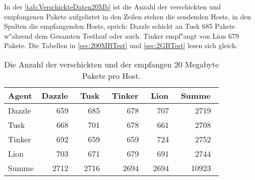 In der \cref{tab:VerschickteDaten20Mb} ist die Anzahl der verschickten und empfangenen Pakete aufgelistet %
in den Zeilen stehen die sendenden Hosts, in den Spalten die empfangenden Hosts, sprich: Dazzle schickt %
an Tusk 685 Pakete w"ahrend dem Gesamten Testlauf oder auch. Tinker empf"angt von Lion 679 Pakete. %
Die Tabellen in \cref{sec:200MBTest} und \cref{sec:2GBTest} lesen sich gleich. %


\begin{table}
\centering
\begin{tabular}{l%
 r<{\,}%
 r<{\,}%
 r<{\,}%
 r<{\,}%
 r<{\,}%
}
Agent  				& Dazzle	& Tusk		& Tinker	& Lion		& Summe		\\
\hline
Dazzle 				& 659		& 685		& 678		& 707		& 2719		\\
Tusk 				& 668		& 701		& 678		& 661		& 2708		\\
Tinker				& 692		& 659		& 659		& 724		& 2752		\\
Lion				& 703		& 671		& 679		& 691		& 2744		\\ 
Summe				& 2712		& 2716		& 2694 		& 2694		& 10923		\\
\end{tabular}
\caption{Die Anzahl der verschickten und der empfangen 20 Megabyte Pakete pro Host.}
\label{tab:VerschicktePakete20Mb}
\end{table}



























